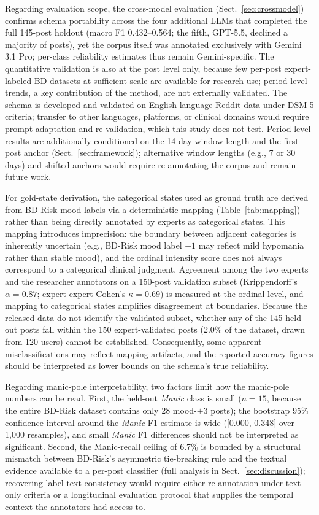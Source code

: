 \documentclass[runningheads]{llncs}
\begin{document}
Regarding evaluation scope, the cross-model evaluation (Sect.~\ref{sec:crossmodel}) confirms schema portability across the four additional LLMs that completed the full 145-post holdout (macro F1 0.432--0.564; the fifth, GPT-5.5, declined a majority of posts), yet the corpus itself was annotated exclusively with Gemini 3.1 Pro; per-class reliability estimates thus remain Gemini-specific. The quantitative validation is also at the post level only, because few per-post expert-labeled BD datasets at sufficient scale are available for research use; period-level trends, a key contribution of the method, are not externally validated. The schema is developed and validated on English-language Reddit data under DSM-5 criteria; transfer to other languages, platforms, or clinical domains would require prompt adaptation and re-validation, which this study does not test. Period-level results are additionally conditioned on the 14-day window length and the first-post anchor (Sect.~\ref{sec:framework}); alternative window lengths (e.g., 7 or 30 days) and shifted anchors would require re-annotating the corpus and remain future work.

For gold-state derivation, the categorical states used as ground truth are derived from BD-Risk mood labels via a deterministic mapping (Table~\ref{tab:mapping}) rather than being directly annotated by experts as categorical states. This mapping introduces imprecision: the boundary between adjacent categories is inherently uncertain (e.g., BD-Risk mood label $+1$ may reflect mild hypomania rather than stable mood), and the ordinal intensity score does not always correspond to a categorical clinical judgment.  Agreement among the two experts and the researcher annotators on a 150-post validation subset (Krippendorff's $\alpha = 0.87$; expert-expert Cohen's $\kappa = 0.69$) is measured at the ordinal level, and mapping to categorical states amplifies disagreement at boundaries. Because the released data do not identify the validated subset, whether any of the 145 held-out posts fall within the 150 expert-validated posts (2.0\% of the dataset, drawn from 120 users) cannot be established. Consequently, some apparent misclassifications may reflect mapping artifacts, and the reported accuracy figures should be interpreted as lower bounds on the schema's true reliability.

Regarding manic-pole interpretability, two factors limit how the  manic-pole numbers can be read. First, the held-out \emph{Manic} class is small ($n=15$, because the entire BD-Risk dataset contains only 28 mood-$+3$ posts); the bootstrap 95\% confidence interval around the  \emph{Manic} F1 estimate is wide ([0.000, 0.348] over 1{,}000 resamples), and small  \emph{Manic} F1 differences should not be interpreted as significant. Second, the Manic-recall ceiling of 6.7\% is bounded by a structural mismatch between BD-Risk's asymmetric tie-breaking rule and the textual evidence available to a per-post classifier (full analysis in Sect.~\ref{sec:discussion}); recovering label-text consistency would require either re-annotation under text-only criteria or a longitudinal evaluation protocol that supplies the temporal context the annotators had access to.
\end{document}
